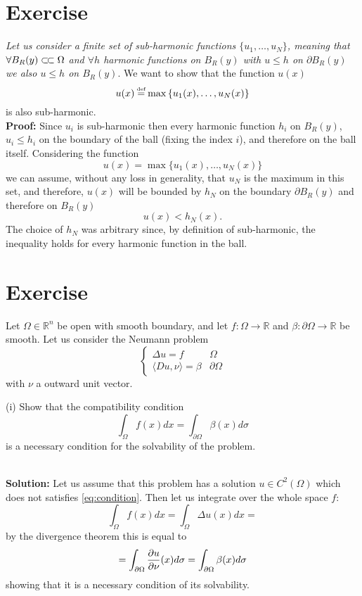 \documentclass{article}
\newcommand{\R}{\mathbb{R}}
\newcommand{\ex}{\textit}
\newcommand{\sol}{\\ \textbf{Solution: }}
\newcommand{\proof}{\\ \textbf{Proof: }}
\newcommand*{\eqdef}{\ensuremath{\overset{\mathclap{\text{\tiny def}}}{=}}}
\newcommand{\ssubset}{\subset\joinrel\subset}
\begin{document}
\section{Exercise}
\ex{Let us consider a finite set of sub-harmonic functions $\{ u_1, \dots, u_N \}$, meaning that $\forall B_R(y) \ssubset \Omega$ and $\forall h$ harmonic functions on $B_R(y)$ with $u\leq h$ on $\partial B_R(y)$ we also $u\leq h$ on $B_R(y)$}. We want to show that the function $u(x)$
\[
    u(x) \eqdef \max{\{ u_1(x), \dots, u_N(x) \}}
\]
is also sub-harmonic.
\proof Since $u_i$ is sub-harmonic then every harmonic function $h_i$ on $B_R(y)$, $u_i\leq h_i$ on the boundary of the ball (fixing the index $i$), and therefore on the ball itself. Considering the function
\[
    u(x) = \max{\{ u_1(x), \dots, u_N(x) \}}
\]
we can assume, without any loss in generality, that $u_N$ is the maximum in this set, and therefore, $u(x)$ will be bounded by $h_N$ on the boundary $\partial B_R (y)$ and therefore on $B_R(y)$
\[
    u(x)<h_N(x).
\]
The choice of $h_N$ was arbitrary since, by definition of sub-harmonic, the inequality holds for every harmonic function in the ball.
\section{Exercise}
\begin{em}
    Let $\Omega \in \R^n$ be open with smooth boundary, and let $f: \Omega \to \R$ and $\beta : \partial \Omega \to \R$ be smooth. Let us consider the Neumann problem
    \begin{equation} \label{eq:Neumann-problem}
        \begin{cases}
            \Delta u = f & \Omega\\
            \langle Du, \nu \rangle = \beta & \partial \Omega
        \end{cases}
    \end{equation}
    with $\nu$ a outward unit vector.

    (i) Show that the compatibility condition
    \begin{equation}\label{eq:condition}
        \int_{\Omega} f(x) dx = \int_{\partial \Omega} \beta (x) d\sigma
    \end{equation}
    is a necessary condition for the solvability of the problem.
\end{em}

\sol Let us assume that this problem has a solution $u \in C^2 (\Omega)$ which does not satisfies \eqref{eq:condition}. Then let us integrate over the whole space $f$:
\[
    \int_\Omega f(x) dx = \int_\Omega \Delta u (x) dx =
\]
by the divergence theorem this is equal to
\[
    = \int_{\partial \Omega} \pdv{u}{\nu} (x) d\sigma = \int_{\partial \Omega} \beta(x) d\sigma
\]
showing that it is a necessary condition of its solvability. 
\end{document}

